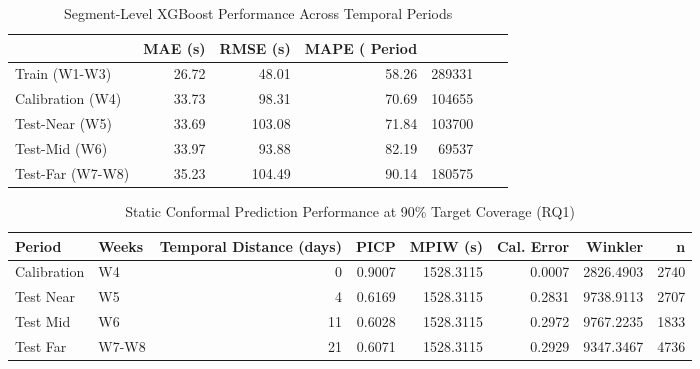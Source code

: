 \begin{table}
\caption{Segment-Level XGBoost Performance Across Temporal Periods}
\label{tab:segment_xgboost_performance}
\begin{tabular}{lrrrr}
\toprule
 & MAE (s) & RMSE (s) & MAPE (%
Period &  &  &  &  \\
\midrule
Train (W1-W3) & 26.72 & 48.01 & 58.26 & 289331 \\
Calibration (W4) & 33.73 & 98.31 & 70.69 & 104655 \\
Test-Near (W5) & 33.69 & 103.08 & 71.84 & 103700 \\
Test-Mid (W6) & 33.97 & 93.88 & 82.19 & 69537 \\
Test-Far (W7-W8) & 35.23 & 104.49 & 90.14 & 180575 \\
\bottomrule
\end{tabular}
\end{table}



\begin{table}
\caption{Static Conformal Prediction Performance at 90\% Target Coverage (RQ1)}
\label{tab:t4_1_static_cp_90}
\begin{tabular}{llrrrrrr}
\toprule
Period & Weeks & Temporal Distance (days) & PICP & MPIW (s) & Cal. Error & Winkler & n \\
\midrule
Calibration & W4 & 0 & 0.9007 & 1528.3115 & 0.0007 & 2826.4903 & 2740 \\
Test Near & W5 & 4 & 0.6169 & 1528.3115 & 0.2831 & 9738.9113 & 2707 \\
Test Mid & W6 & 11 & 0.6028 & 1528.3115 & 0.2972 & 9767.2235 & 1833 \\
Test Far & W7-W8 & 21 & 0.6071 & 1528.3115 & 0.2929 & 9347.3467 & 4736 \\
\bottomrule
\end{tabular}
\end{table}



